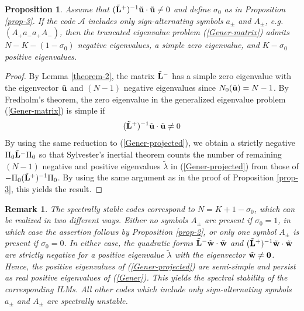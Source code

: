 \documentclass[12pt,reqno]{amsart}
\newtheorem{remark}{Remark}
\newtheorem{prop}{Proposition}
\begin{document}
\begin{prop}
	\label{prop-4}
	Assume that $(\tilde{\bf L}^+)^{-1} \tilde{\bf u} \cdot \tilde{\bf u} \neq 0$ and define $\sigma_0$ as in Proposition \ref{prop-3}. 
	If the code $\mathcal{A}$ includes only sign-alternating symbols $a_\pm$ and $A_\pm$, e.g. $(A_+ a_-a_+A_-)$,  then 	the truncated eigenvalue problem (\ref{Gener-matrix}) admits $N - K - (1-\sigma_0)$ negative eigenvalues, a simple zero eigenvalue, and $K - \sigma_0$ positive eigenvalues.
\end{prop}

\begin{proof}
	By Lemma \ref{theorem-2}, the matrix $\tilde{\bf L}^-$ has a simple zero eigenvalue with the eigenvector $\tilde{\bf u}$ and $(N-1)$ negative eigenvalues since $N_0(\tilde{\bf u}) = N-1$. By Fredholm's theorem, the zero eigenvalue in the generalized eigenvalue problem (\ref{Gener-matrix}) is simple if 
	$$
	(\tilde{\bf L}^+)^{-1} \tilde{\bf u} \cdot \tilde{\bf u} \neq 0
	$$ 
	By using the same reduction to (\ref{Gener-projected}), 
	we obtain a strictly negative $\Pi_0 \tilde{\bf L}^- \Pi_0$ so that 
	Sylvester's inertial theorem counts the number of remaining $(N-1)$ negative and positive eigenvalues $\tilde{\lambda}$ in (\ref{Gener-projected}) from 
	those of $-\Pi_0 (\tilde{\bf L}^+)^{-1} \Pi_0$. By using the same 
	argument as in the proof of Proposition \ref{prop-3}, this yields the result.
\end{proof}

\begin{remark}
	The spectrally stable codes correspond to $N = K + 1 - \sigma_0$, which can be realized in two different ways. Either no symbols $A_{\pm}$ are present if $\sigma_0 = 1$, in which case the assertion follows by Proposition \ref{prop-2}, or only one symbol $A_{\pm}$ is present if $\sigma_0 = 0$. In either case, the quadratic forms 
	$\tilde{\bf L}^- \tilde{\bf w}  \cdot \tilde{\bf w} $ and  $(\tilde{\bf L}^+)^{-1} \tilde{\bf w}  \cdot \tilde{\bf w} $ are strictly negative for a positive eigenvalue $\tilde{\lambda}$ with the eigenvector $\tilde{\bf w} \neq {\bf 0}$. Hence, the positive eigenvalues of (\ref{Gener-projected}) are semi-simple and persist as real positive eigenvalues of (\ref{Gener}). This yields the spectral stability of the corresponding ILMs. All other codes which include only sign-alternating symbols $a_{\pm}$ and $A_{\pm}$ are spectrally unstable. 
\end{remark}
\end{document}
